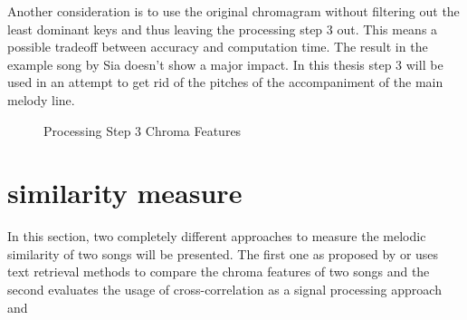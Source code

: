Another consideration is to use the original chromagram without filtering out the least dominant keys and thus leaving the processing step 3 out. This means a possible tradeoff between accuracy and computation time. The result in the example song by Sia doesn't show a major impact. In this thesis step 3 will be used in an attempt to get rid of the pitches of the accompaniment of the main melody line.
\begin{figure}[htbp]
	\centering
	\caption{Processing Step 3 Chroma Features}
	\label{fig:nomax}
\end{figure}

\section{similarity measure}
In this section, two completely different approaches to measure the melodic similarity of two songs will be presented. The first one as proposed by \cite{chroma1} or \cite{chroma4} uses text retrieval methods to compare the chroma features of two songs and the second evaluates the usage of cross-correlation as a signal processing approach \cite{chroma2} and \cite{chroma3}

